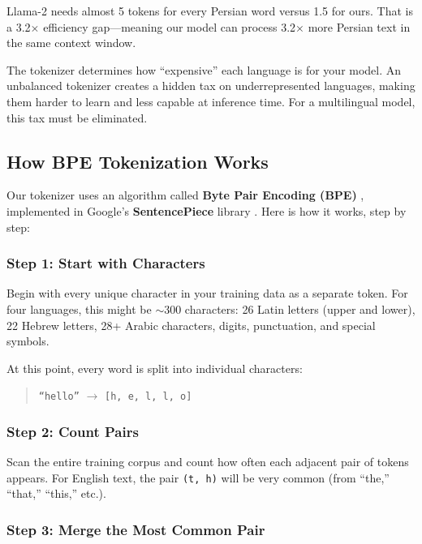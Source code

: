 \documentclass[11pt,a4paper]{article}
\begin{document}
Llama-2 needs almost 5 tokens for every Persian word versus 1.5 for ours. That is a 3.2$\times$ efficiency gap---meaning our model can process 3.2$\times$ more Persian text in the same context window.

\begin{keyidea}
The tokenizer determines how ``expensive'' each language is for your model. An unbalanced tokenizer creates a hidden tax on underrepresented languages, making them harder to learn and less capable at inference time. For a multilingual model, this tax must be eliminated.
\end{keyidea}

\subsection{How BPE Tokenization Works}

Our tokenizer uses an algorithm called \textbf{Byte Pair Encoding (BPE)} \citep{sennrich2016bpe}, implemented in Google's \textbf{SentencePiece} library \citep{kudo2018sentencepiece}. Here is how it works, step by step:

\subsubsection{Step 1: Start with Characters}

Begin with every unique character in your training data as a separate token. For four languages, this might be $\sim$300 characters: 26 Latin letters (upper and lower), 22 Hebrew letters, 28+ Arabic characters, digits, punctuation, and special symbols.

At this point, every word is split into individual characters:

\begin{quote}
\texttt{``hello''} $\rightarrow$ \texttt{[h, e, l, l, o]}
\end{quote}

\subsubsection{Step 2: Count Pairs}

Scan the entire training corpus and count how often each adjacent pair of tokens appears. For English text, the pair \texttt{(t, h)} will be very common (from ``the,'' ``that,'' ``this,'' etc.).

\subsubsection{Step 3: Merge the Most Common Pair}
\end{document}
